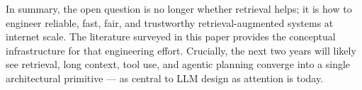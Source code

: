 \documentclass{article}
\begin{document}
In summary, the open question is no longer whether retrieval helps; it is how to engineer reliable, fast, fair, and trustworthy retrieval-augmented systems at internet scale. The literature surveyed in this paper provides the conceptual infrastructure for that engineering effort. Crucially, the next two years will likely see retrieval, long context, tool use, and agentic planning converge into a single architectural primitive --- as central to LLM design as attention is today.



\end{document}
